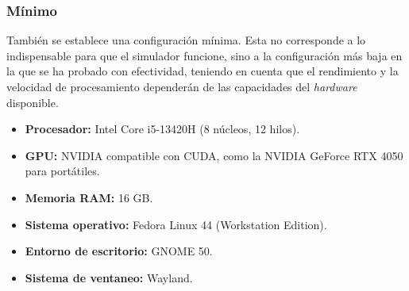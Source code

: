 \subsubsection{Mínimo}

También se establece una configuración mínima. Esta no corresponde a lo indispensable para que el simulador funcione, sino a la configuración más baja en la que se ha probado con efectividad, teniendo en cuenta que el rendimiento y la velocidad de procesamiento dependerán de las capacidades del \textit{hardware} disponible.

\begin{itemize}
	
	\item \textbf{Procesador:} Intel Core i5-13420H (8 núcleos, 12 hilos).
	
	\item \textbf{GPU:} NVIDIA compatible con CUDA, como la NVIDIA GeForce RTX 4050 para portátiles.
	
	\item \textbf{Memoria RAM:} 16 GB.
	
	\item \textbf{Sistema operativo:} Fedora Linux 44 (Workstation Edition).
	
	\item \textbf{Entorno de escritorio:} GNOME 50.
	
	\item \textbf{Sistema de ventaneo:} Wayland.
	
\end{itemize}